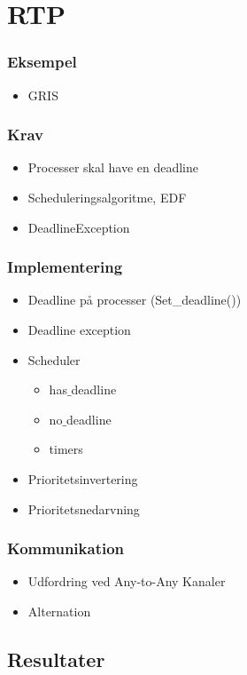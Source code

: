 \documentclass[12pt]{beamer}
\begin{document}
\section{RTP}
\begin{frame}
  \frametitle{Eksempel}
  \begin{itemize}   
    \item GRIS
  \end{itemize}
\end{frame}

\begin{frame}
  \frametitle{Krav}
  \begin{itemize}   
	\item Processer skal have en  deadline
	\item Scheduleringsalgoritme, EDF
	\item DeadlineException
  \end{itemize}
\end{frame}


\begin{frame}
  \frametitle{Implementering}
  \begin{itemize}   
    \item Deadline på processer (Set\_deadline())
	\item Deadline exception
    \item Scheduler 
	\begin{itemize}
		\item has$\_$deadline 
		\item no$\_$deadline
		\item timers
	\end{itemize}
	\item Prioritetsinvertering
	\item Prioritetsnedarvning
  \end{itemize}
\end{frame}


\begin{frame}
\frametitle{Kommunikation}
\begin{itemize}
	\item Udfordring ved Any-to-Any Kanaler 
 	\item Alternation
\end{itemize} 
\end{frame} 

\subsection{Resultater}
\end{document}

